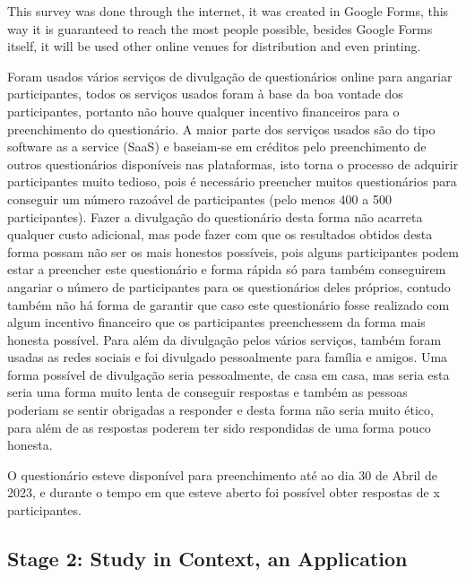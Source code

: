 This survey was done through the internet, it was created in Google Forms,
this way it is guaranteed to reach the most people possible, besides Google
Forms itself, it will be used other online venues for distribution and even
printing.

Foram usados vários serviços de divulgação de questionários online
para angariar participantes, todos os serviços usados foram à base
da boa vontade dos participantes, portanto não houve qualquer incentivo
financeiros para o preenchimento do questionário. A maior parte dos serviços
usados são do tipo software as a service (SaaS) e baseiam-se em créditos
pelo preenchimento de outros questionários disponíveis nas plataformas,
isto torna o processo de adquirir participantes muito tedioso, pois
é necessário preencher muitos questionários para conseguir um número
razoável de participantes (pelo menos 400 a 500 participantes). Fazer a
divulgação do questionário desta forma não acarreta qualquer custo adicional,
mas pode fazer com que os resultados obtidos desta forma possam não
ser os mais honestos possíveis, pois alguns participantes podem estar
a preencher este questionário e forma rápida só para também conseguirem
angariar o número de participantes para os questionários deles próprios,
contudo também não há forma de garantir que caso este questionário fosse
realizado com algum incentivo financeiro que os participantes preenchessem
da forma mais honesta possível. Para além da divulgação pelos vários serviços,
também foram usadas as redes sociais e foi divulgado pessoalmente para família e
amigos. Uma forma possível de divulgação seria pessoalmente, de casa em casa, mas
seria esta seria uma forma muito lenta de conseguir respostas e também as
pessoas poderiam se sentir obrigadas a responder e desta forma não seria
muito ético, para além de as respostas poderem ter sido respondidas de uma
forma pouco honesta.

O questionário esteve disponível para preenchimento até ao dia 30 de Abril de 2023,
e durante o tempo em que esteve aberto foi possível obter respostas de x participantes.


\subsection{Stage 2: Study in Context, an Application}

